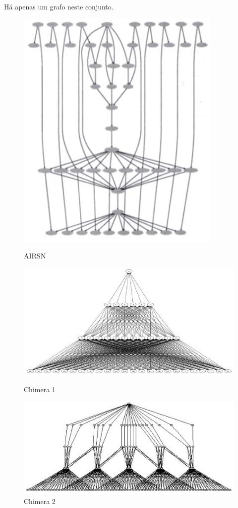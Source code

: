 \documentclass[a4paper,10pt]{article}
\begin{document}
Há apenas um grafo neste conjunto.

\begin{figure}[!htb]

\centering
\includegraphics[scale=.25]{figures/airsn.png}
\caption{AIRSN \protect\cite{bit}}
\label{airsn}

\includegraphics[scale=.25]{figures/chimera1.png}
\caption{Chimera 1 \protect\cite{bit}}
\label{chimera1}

\includegraphics[scale=.25]{figures/chimera2.png}
\caption{Chimera 2 \protect\cite{bit}}
\label{chimera2}


\end{figure}
\end{document}
